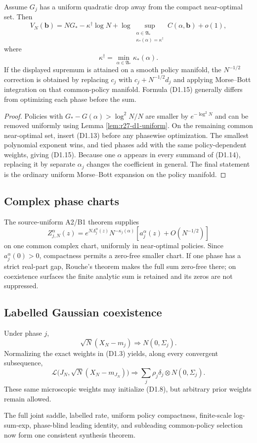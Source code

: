 \begin{theorem}
\label{thm:r27-d1-subleading}
Assume $G_j$ has a uniform quadratic drop away from the compact
near-optimal set.  Then
\[
 V_N(\mathbf b)
 =NG_*-\kappa^\dagger\log N+
 \log\sup_{\substack{\alpha\in\mathfrak A_*\\
                      \kappa_*(\alpha)=\kappa^\dagger}}
 C(\alpha,\mathbf b)+o(1),                                \tag{D1.15}
\]
where
\[
 \kappa^\dagger=\min_{\alpha\in\mathfrak A_*}\kappa_*(\alpha).
\]
If the displayed supremum is attained on a smooth policy manifold, the
$N^{-1/2}$ correction is obtained by replacing $c_j$ with
$c_j+N^{-1/2}d_j$ and applying Morse--Bott integration on that common-policy
manifold.  Formula (D1.15) generally differs from optimizing each phase
before the sum.
\end{theorem}

\begin{proof}
Policies with $G_*-G(\alpha)>\log^2N/N$ are smaller by
$e^{-\log^2N}$ and can be removed uniformly using Lemma
\ref{lem:r27-d1-uniform}.  On the remaining common near-optimal set, insert
(D1.13) before any phasewise optimization.  The smallest polynomial exponent
wins, and tied phases add with the same policy-dependent weights, giving
(D1.15).  Because one $\alpha$ appears in every summand of (D1.14), replacing
it by separate $\alpha_j$ changes the coefficient in general.  The final
statement is the ordinary uniform Morse--Bott expansion on the policy
manifold.
\end{proof}

\subsection{Complex phase charts}

The source-uniform A2/B1 theorem supplies
\[
 Z_{j,N}^\alpha(z)
 =e^{N\Lambda_j^\alpha(z)}
 N^{-\kappa_j(\alpha)}
 \left[a_j^\alpha(z)+O(N^{-1/2})\right]                   \tag{D1.16}
\]
on one common complex chart, uniformly in near-optimal policies.  Since
$a_j^\alpha(0)>0$, compactness permits a zero-free smaller chart.  If one
phase has a strict real-part gap, Rouche's theorem makes the full sum zero-free
there; on coexistence surfaces the finite analytic sum is retained and its
zeros are not suppressed.

\subsection{Labelled Gaussian coexistence}

Under phase $j$,
\[
 \sqrt N(X_N-m_j)\Rightarrow N(0,\Sigma_j).
\]
Normalizing the exact weights in (D1.3) yields, along every convergent
subsequence,
\[
 \mathcal L\bigl(J_N,\sqrt N(X_N-m_{J_N})\bigr)
 \Rightarrow\sum_j\rho_j\delta_j\otimes N(0,\Sigma_j).    \tag{D1.17}
\]
These same microscopic weights may initialize (D1.8), but arbitrary prior
weights remain allowed.

The full joint saddle, labelled rate, uniform policy compactness, finite-scale
log-sum-exp, phase-blind leading identity, and subleading common-policy
selection now form one consistent synthesis theorem.
